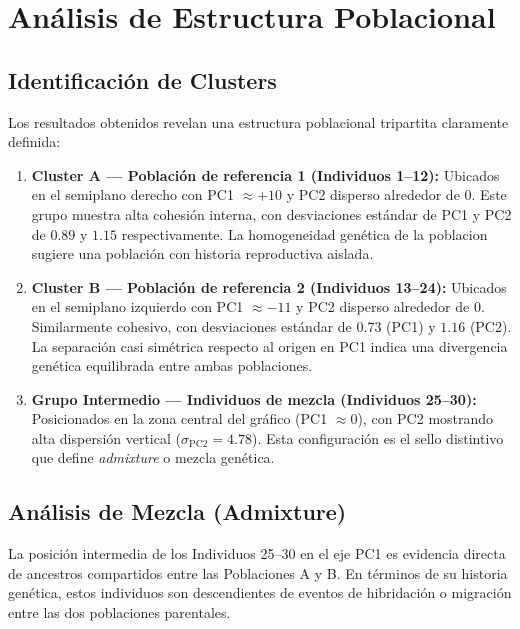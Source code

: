 \documentclass[12pt,a4paper]{article}
\theoremstyle{definition}
\begin{document}
\section{An\'{a}lisis de Estructura Poblacional}\label{sec:analisis}

\subsection{Identificaci\'{o}n de Clusters}

Los resultados obtenidos revelan una estructura poblacional tripartita claramente definida:

\begin{enumerate}
    \item \textbf{Cluster A --- Poblaci\'{o}n de referencia 1 (Individuos 1--12):} Ubicados en el semiplano derecho con PC1 $\approx +10$ y PC2 disperso alrededor de 0. Este grupo muestra alta cohesi\'{o}n interna, con desviaciones est\'{a}ndar de PC1 y PC2 de $0.89$ y $1.15$ respectivamente. La homogeneidad gen\'{e}tica de la poblacion sugiere una poblaci\'{o}n con historia reproductiva aislada.

    \item \textbf{Cluster B --- Poblaci\'{o}n de referencia 2 (Individuos 13--24):} Ubicados en el semiplano izquierdo con PC1 $\approx -11$ y PC2 disperso alrededor de 0. Similarmente cohesivo, con desviaciones est\'{a}ndar de $0.73$ (PC1) y $1.16$ (PC2). La separaci\'{o}n casi sim\'{e}trica respecto al origen en PC1 indica una divergencia gen\'{e}tica equilibrada entre ambas poblaciones.

    \item \textbf{Grupo Intermedio --- Individuos de mezcla (Individuos 25--30):} Posicionados en la zona central del gr\'{a}fico (PC1 $\approx 0$), con PC2 mostrando alta dispersi\'{o}n vertical ($\sigma_{\text{PC2}} = 4.78$). Esta configuraci\'{o}n es el sello distintivo que define \emph{admixture} o mezcla gen\'{e}tica.
\end{enumerate}

\subsection{An\'{a}lisis de Mezcla (Admixture)}

La posici\'{o}n intermedia de los Individuos 25--30 en el eje PC1 es evidencia directa de ancestros compartidos entre las Poblaciones A y B. En t\'{e}rminos de su historia gen\'{e}tica, estos individuos son descendientes de eventos de hibridaci\'{o}n o migraci\'{o}n entre las dos poblaciones parentales.
\end{document}
